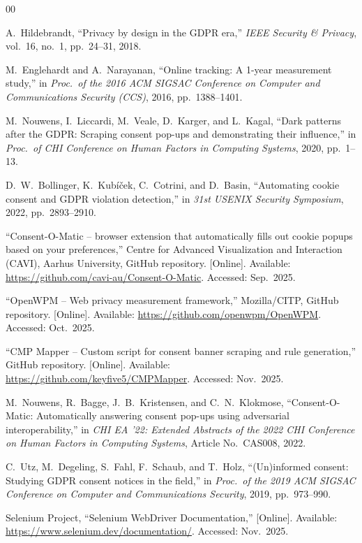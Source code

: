 \documentclass[conference]{IEEEtran}
\begin{document}
\begin{thebibliography}{00}


A.~Hildebrandt, ``Privacy by design in the GDPR era,'' \emph{IEEE Security \& Privacy}, vol.~16, no.~1, pp.~24--31, 2018.


M.~Englehardt and A.~Narayanan, ``Online tracking: A 1-year measurement study,'' in \emph{Proc.\ of the 2016 ACM SIGSAC Conference on Computer and Communications Security (CCS)}, 2016, pp.~1388--1401.


M.~Nouwens, I.~Liccardi, M.~Veale, D.~Karger, and L.~Kagal, ``Dark patterns after the GDPR: Scraping consent pop-ups and demonstrating their influence,'' in \emph{Proc.\ of CHI Conference on Human Factors in Computing Systems}, 2020, pp.~1--13.


D.~W.~Bollinger, K.~Kub\'{i}\v{c}ek, C.~Cotrini, and D.~Basin, ``Automating cookie consent and GDPR violation detection,'' in \emph{31st USENIX Security Symposium}, 2022, pp.~2893--2910.


``Consent-O-Matic -- browser extension that automatically fills out cookie popups based on your preferences,'' Centre for Advanced Visualization and Interaction (CAVI), Aarhus University, GitHub repository. [Online]. Available: \url{https://github.com/cavi-au/Consent-O-Matic}. Accessed: Sep.~2025.


``OpenWPM -- Web privacy measurement framework,'' Mozilla/CITP, GitHub repository. [Online]. Available: \url{https://github.com/openwpm/OpenWPM}. Accessed: Oct.~2025.


``CMP Mapper -- Custom script for consent banner scraping and rule generation,'' GitHub repository. [Online]. Available: \url{https://github.com/keyfive5/CMPMapper}. Accessed: Nov.~2025.


M.~Nouwens, R.~Bagge, J.~B.~Kristensen, and C.~N.~Klokmose, ``Consent-O-Matic: Automatically answering consent pop-ups using adversarial interoperability,'' in \emph{CHI EA '22: Extended Abstracts of the 2022 CHI Conference on Human Factors in Computing Systems}, Article No.~CAS008, 2022.


C.~Utz, M.~Degeling, S.~Fahl, F.~Schaub, and T.~Holz, ``(Un)informed consent: Studying GDPR consent notices in the field,'' in \emph{Proc.\ of the 2019 ACM SIGSAC Conference on Computer and Communications Security}, 2019, pp.~973--990.


Selenium Project, ``Selenium WebDriver Documentation,'' [Online]. Available: \url{https://www.selenium.dev/documentation/}. Accessed: Nov.~2025.

\end{thebibliography}
\end{document}
